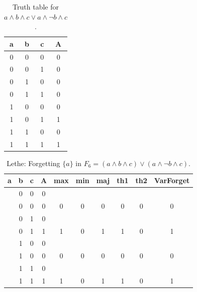 \begin{table}[!tb]
    \centering
    \begin{tabular}{|c|c|c|c|}
        \hline
        \textbf{a} & \textbf{b} & \textbf{c} & \textbf{A} \\ \hline
        0 & 0 & 0 & 0 \\ \hline
        0 & 0 & 1 & 0 \\ \hline
        0 & 1 & 0 & 0 \\ \hline
        0 & 1 & 1 & 0 \\ \hline
        1 & 0 & 0 & 0 \\ \hline
        1 & 0 & 1 & 1 \\ \hline
        1 & 1 & 0 & 0 \\ \hline
        1 & 1 & 1 & 1 \\ \hline
    \end{tabular}
    \caption{Truth table for $a \land b \land c \lor a \land \lnot b \land c$.}
    \label{tab:truthtab}
\end{table}

\begin{table}[!tb]
    \centering
    \begin{tabular}{|c|c|c|c|c|c|c|c|c|c|}
        \hline
        \textbf{a} & \textbf{b} & \textbf{c} & \textbf{A} & \textbf{max} & \textbf{min} & \textbf{maj} & \textbf{th1} & \textbf{th2} & \textbf{VarForget} \\ \hline
        \rowcolor{gray!40}  & 0 & 0 & 0 &  &  &  &  &  &  \\ \hline
        \rowcolor{gray!40}  & 0 & 0 & 0 & 0 & 0 & 0 & 0 & 0 & 0 \\ \hline
        \rowcolor{blue!40}  & 0 & 1 & 0 &  &  &  &  &  &  \\ \hline
        \rowcolor{blue!40}  & 0 & 1 & 1 & 1 & 0 & 1 & 1 & 0 & 1 \\ \hline
        \rowcolor{red!40}  & 1 & 0 & 0 &  &  &  &  &  &  \\ \hline
        \rowcolor{red!40}  & 1 & 0 & 0 & 0 & 0 & 0 & 0 & 0 & 0 \\ \hline
        \rowcolor{green!40}  & 1 & 1 & 0 &  &  &  &  &  &  \\ \hline
        \rowcolor{green!40}  & 1 & 1 & 1 & 1 & 0 & 1 & 1 & 0 & 1 \\ \hline
    \end{tabular}
    \caption{Lethe: Forgetting $\{a\}$ in $F_{6} = (a \land b \land c) \lor (a \land \lnot b \land c)$.}
    \label{tab:lethe-F6-a}
\end{table}
